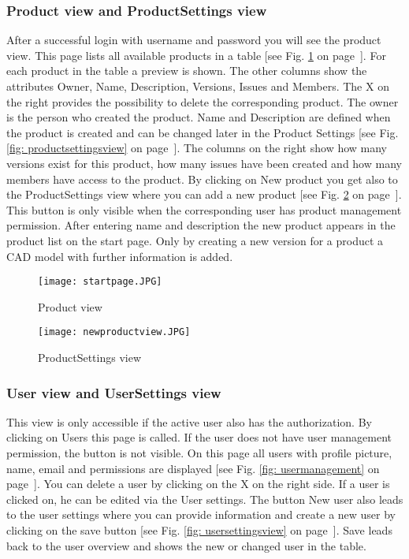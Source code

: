     \subsubsection*{Product view and ProductSettings view}
    After a successful login with username and password you will see the product view. This page lists all available products in a table [see Fig. \ref{fig: startpage} on page~\pageref{fig: startpage}]. For each product in the table a preview is shown. The other columns show the attributes Owner, Name, Description, Versions, Issues and Members. The X on the right provides the possibility to delete the corresponding product. The owner is the person who created the product. Name and Description are defined when the product is created and can be changed later in the Product Settings [see Fig. \ref{fig: productsettingsview} on page~\pageref{fig: productsettingsview}]. The columns on the right show how many versions exist for this product, how many issues have been created and how many members have access to the product. By clicking on New product you get also to the ProductSettings view where you can add a new product [see Fig. \ref{fig: newproductview} on page~\pageref{fig: newproductview}]. This button is only visible when the corresponding user has product management permission. After entering name and description the new product appears in the product list on the start page. Only by creating a new version for a product a CAD model with further information is added.

    \begin{figure}[h]
        \centering
        \texttt{[image: startpage.JPG]}
        \caption{Product view}
        \label{fig: startpage}
    \end{figure}

    \begin{figure}[h]
        \centering
        \texttt{[image: newproductview.JPG]}
        \caption{ProductSettings view}
        \label{fig: newproductview}
    \end{figure}

    \subsubsection*{User view and UserSettings view}
    This view is only accessible if the active user also has the authorization. By clicking on Users this page is called. If the user does not have user management permission, the button is not visible. On this page all users with profile picture, name, email and permissions are displayed [see Fig. \ref{fig: usermanagement} on page~\pageref{fig: usermanagement}]. You can delete a user by clicking on the X on the right side. If a user is clicked on, he can be edited via the User settings. The button New user also leads to the user settings where you can provide information and create a new user by clicking on the save button [see Fig. \ref{fig: usersettingsview} on page~\pageref{fig: usersettingsview}]. Save leads back to the user overview and shows the new or changed user in the table.
    
